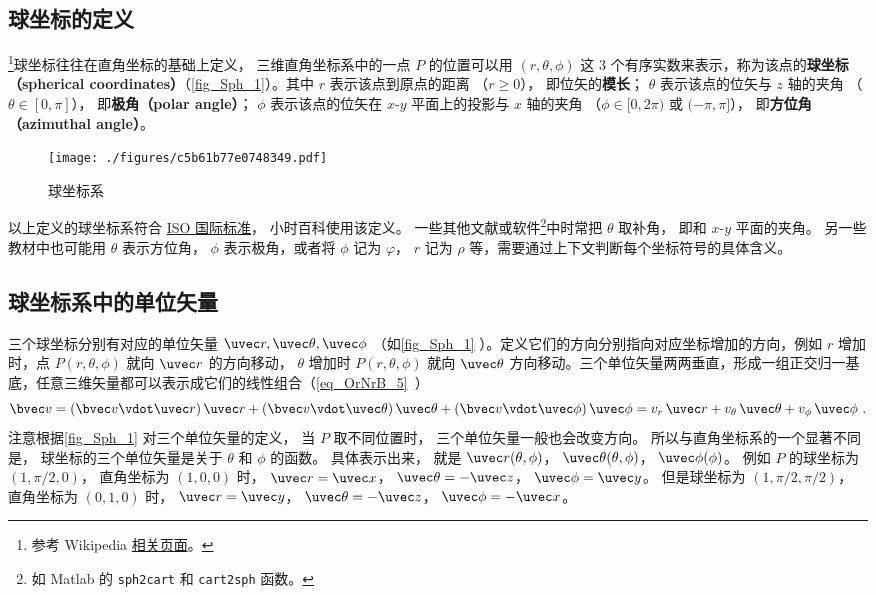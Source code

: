 

\subsection{球坐标的定义}

\footnote{参考 Wikipedia \href{https://en.wikipedia.org/wiki/Spherical_coordinate_system}{相关页面}。}球坐标往往在直角坐标的基础上定义， 三维直角坐标系中的一点 $P$ 的位置可以用 $(r,\theta ,\phi )$ 这 3 个有序实数来表示，称为该点的\textbf{球坐标（spherical coordinates）}（\autoref{fig_Sph_1}）。其中 $r$ 表示该点到原点的距离 （$r \geqslant 0$）， 即位矢的\textbf{模长}； $\theta$ 表示该点的位矢与 $z$ 轴的夹角 （$\theta  \in [0,\pi]$）， 即\textbf{极角（polar angle）}； $\phi$ 表示该点的位矢在 $x$-$y$ 平面上的投影与 $x$ 轴的夹角 （$\phi  \in [0,2\pi)$ 或 $(- \pi,\pi]$）， 即\textbf{方位角（azimuthal angle）}。

\begin{figure}[ht]
\centering
\texttt{[image: ./figures/c5b61b77e0748349.pdf]}
\caption{球坐标系}\label{fig_Sph_1}
\end{figure}

以上定义的球坐标系符合 \href{https://www.iso.org/standard/64973.html}{ISO 国际标准}， 小时百科使用该定义。 一些其他文献或软件\footnote{如 Matlab 的 \lstinline|sph2cart| 和 \lstinline|cart2sph| 函数。}中时常把 $\theta$ 取补角， 即和 $x$-$y$ 平面的夹角。 另一些教材中也可能用 $\theta $ 表示方位角， $\phi $ 表示极角，或者将 $\phi $ 记为 $\varphi $，  $r$ 记为 $\rho $ 等，需要通过上下文判断每个坐标符号的具体含义。

\subsection{球坐标系中的单位矢量}
三个球坐标分别有对应的单位矢量 $\uvec r, \uvec\theta, \uvec\phi$ （如\autoref{fig_Sph_1} ）。定义它们的方向分别指向对应坐标增加的方向，例如 $r$ 增加时，点 $P(r,\theta ,\phi )$ 就向 $\uvec r$ 的方向移动， $\theta$ 增加时 $P(r,\theta ,\phi )$ 就向 $\uvec \theta$ 方向移动。三个单位矢量两两垂直，形成一组正交归一基底，任意三维矢量都可以表示成它们的线性组合（\autoref{eq_OrNrB_5}~）
\begin{equation}\label{eq_Sph_1}
\bvec v = (\bvec v \vdot \uvec r)\,\uvec r + (\bvec v \vdot \uvec \theta)\,\uvec \theta  + (\bvec v \vdot \uvec \phi)\,\uvec \phi  = v_r \,\uvec r + v_\theta \,\uvec \theta  + v_\phi \,\uvec \phi ~.
\end{equation}
注意根据\autoref{fig_Sph_1} 对三个单位矢量的定义， 当 $P$ 取不同位置时， 三个单位矢量一般也会改变方向。 所以与直角坐标系的一个显著不同是， 球坐标的三个单位矢量是关于 $\theta$ 和 $\phi$ 的函数。 具体表示出来， 就是 $\uvec r(\theta ,\phi )$，  $\uvec \theta (\theta ,\phi )$，  $\uvec \phi (\phi )$。 
例如 $P$ 的球坐标为 $(1, \pi/2, 0)$， 直角坐标为 $(1, 0, 0)$ 时，
$\uvec r = \uvec x$， $\uvec \theta  =  - \uvec z$， $\uvec \phi  = \uvec y$。 
但是球坐标为 $(1, \pi/2, \pi/2)$， 直角坐标为 $(0, 1, 0)$ 时， $\uvec r = \uvec y$， $\uvec \theta  =  - \uvec z$， $\uvec \phi  =  - \uvec x$。


